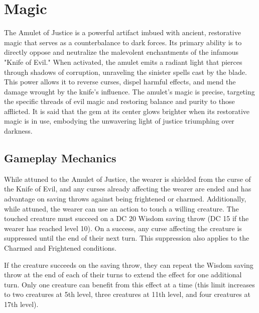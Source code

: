 \section*{Magic}
{\entryfont The Amulet of Justice is a powerful artifact imbued with ancient, restorative magic that serves as a counterbalance to dark forces. Its primary ability is to directly oppose and neutralize the malevolent enchantments of the infamous "Knife of Evil." When activated, the amulet emits a radiant light that pierces through shadows of corruption, unraveling the sinister spells cast by the blade. This power allows it to reverse curses, dispel harmful effects, and mend the damage wrought by the knife's influence. The amulet's magic is precise, targeting the specific threads of evil magic and restoring balance and purity to those afflicted. It is said that the gem at its center glows brighter when its restorative magic is in use, embodying the unwavering light of justice triumphing over darkness.}

\subsection*{Gameplay Mechanics}
{\entryfont While attuned to the Amulet of Justice, the wearer is shielded from the curse of the Knife of Evil, and any curses already affecting the wearer are ended and has advantage on saving throws against being frightened or charmed. Additionally, while attuned, the wearer can use an action to touch a willing creature. The touched creature must succeed on a DC 20 Wisdom saving throw (DC 15 if the wearer has reached level 10). On a success, any curse affecting the creature is suppressed until the end of their next turn. This suppression also applies to the Charmed and Frightened conditions.

If the creature succeeds on the saving throw, they can repeat the Wisdom saving throw at the end of each of their turns to extend the effect for one additional turn. Only one creature can benefit from this effect at a time (this limit increases to two creatures at 5th level, three creatures at 11th level, and four creatures at 17th level).}